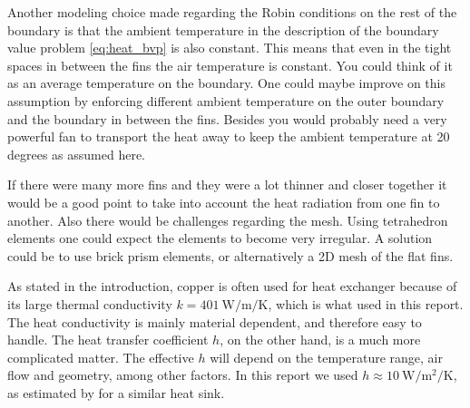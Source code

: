 Another modeling choice made regarding the Robin conditions on the rest of the boundary is that the ambient temperature in the description of the boundary value problem \eqref{eq:heat_bvp} is also constant. This means that even in the tight spaces in between the fins the air temperature is constant. You could think of it as an average temperature on the boundary. One could maybe improve on this assumption by enforcing different ambient temperature on the outer boundary and the boundary in between the fins. Besides you would probably need a very powerful fan to transport the heat away to keep the ambient temperature at 20 degrees as assumed here.

If there were many more fins and they were a lot thinner and closer together it would be a good point to take into account the heat radiation from one fin to another. Also there would be challenges regarding the mesh. Using tetrahedron elements one could expect the elements to become very irregular. A solution could be to use brick prism elements, or alternatively a 2D mesh of the flat fins.

As stated in the introduction, copper is often used for heat exchanger because of its large thermal conductivity $k = \SI{401}{\watt\per\meter\per\kelvin}$, which is what used in this report. The heat conductivity is mainly material dependent, and therefore easy to handle. The heat transfer coefficient $h$, on the other hand, is a much more complicated matter. The effective $h$ will depend on the temperature range, air flow and geometry, among other factors. In this report we used $h \approx \SI{10}{\watt\per\meter\squared\per\kelvin}$, as estimated by \cite{heat_transfer_coeff} for a similar heat sink.